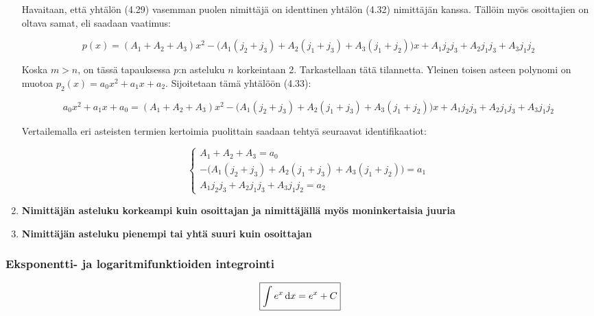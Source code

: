 \documentclass[../integrointiopas.tex]{subfiles}
\begin{document}
\begin{enumerate}
		Havaitaan, että yhtälön (4.29) vasemman puolen nimittäjä on identtinen yhtälön (4.32) nimittäjän kanssa. Tällöin myös osoittajien on oltava samat, eli saadaan vaatimus:
		
		\begin{equation}
			p(x) = (A_1 + A_2 + A_3)x^2 - \Big(A_1(j_2 + j_3) + A_2(j_1 + j_3) + A_3(j_1 + j_2)\Big)x  + A_1j_2j_3 + A_2j_1j_3 + A_3j_1j_2
		\end{equation}
		
		Koska $m > n$, on tässä tapauksessa $p$:n asteluku $n$ korkeintaan 2. Tarkastellaan tätä tilannetta. Yleinen toisen asteen polynomi on muotoa $p_2(x) = a_0x^2 + a_1x + a_2$. Sijoitetaan tämä yhtälöön (4.33):
		
		\begin{equation}
			a_0x^2 + a_1x + a_0 = (A_1 + A_2 + A_3)x^2 - \Big(A_1(j_2 + j_3) + A_2(j_1 + j_3) + A_3(j_1 + j_2)\Big)x  + A_1j_2j_3 + A_2j_1j_3 + A_3j_1j_2
		\end{equation}
	
		Vertailemalla eri asteisten termien kertoimia puolittain saadaan tehtyä seuraavat identifikaatiot:
		
		\begin{equation}
			\begin{cases}
				A_1 + A_2 + A_3 = a_0 \\
				-\Big(A_1(j_2 + j_3) + A_2(j_1 + j_3) + A_3(j_1 + j_2)\Big) = a_1 \\
				A_1j_2j_3 + A_2j_1j_3 + A_3j_1j_2 = a_2
			\end{cases}
		\end{equation}
			
			
	
		
		
		
		\item \textbf{Nimittäjän asteluku korkeampi kuin osoittajan ja nimittäjällä myös moninkertaisia juuria}
		
		\item \textbf{Nimittäjän asteluku pienempi tai yhtä suuri kuin osoittajan}
	\end{enumerate}
 	
	\subsubsection{Eksponentti- ja logaritmifunktioiden integrointi}
	
	\begin{equation}
		\boxed{\int e^{x}\odif{x} = e^x + C}
	\end{equation}
\end{document}
